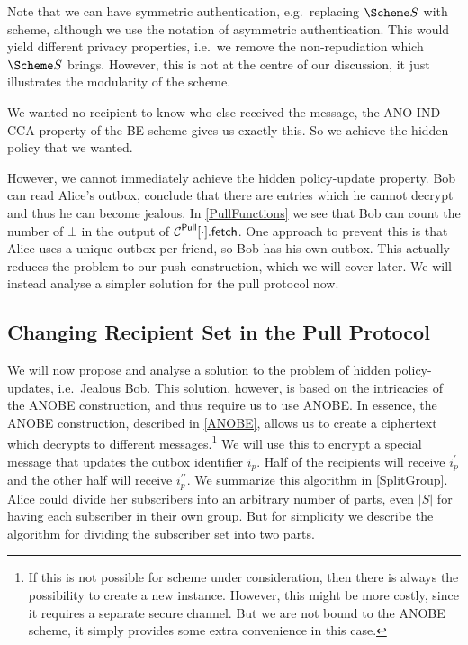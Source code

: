 Note that we can have symmetric authentication, e.g.\ replacing \(\S\) with 
 scheme, although we use the notation of asymmetric authentication.
This would yield different privacy properties, i.e.\ we remove the 
non-repudiation which \(\S\) brings.
However, this is not at the centre of our discussion, it just illustrates the 
modularity of the scheme.

We wanted no recipient to know who else received the message, the ANO-IND-CCA 
property of the \ac{BE} scheme gives us exactly this.
So we achieve the hidden policy that we wanted.

However, we cannot immediately achieve the hidden policy-update property.
Bob can read Alice's outbox, conclude that there are entries which he cannot 
decrypt and thus he can become jealous.
In \cref{PullFunctions} we see that Bob can count the number of \(\bot\) in the 
output of \(\pget{\cdot}\).
One approach to prevent this is that Alice uses a unique outbox per friend, so 
Bob has his own outbox.
This actually reduces the problem to our push construction, which we will cover 
later.
We will instead analyse a simpler solution for the pull protocol now.

\subsection{Changing Recipient Set in the Pull Protocol}
\label{ChangingPullRecipientSet}

We will now propose and analyse a solution to the problem of hidden 
policy-updates, i.e.\ Jealous Bob.
This solution, however, is based on the intricacies of the \ac{ANOBE} 
construction, and thus require us to use \ac{ANOBE}.
In essence, the \ac{ANOBE} construction, described in \cref{ANOBE}, allows us 
to create a ciphertext which decrypts to different messages.\footnote{%
  If this is not possible for  scheme under consideration, then there 
  is always the possibility to create a new instance.
  However, this might be more costly, since it requires a separate secure 
  channel.
  But we are not bound to the \ac{ANOBE} scheme, it simply provides some extra 
  convenience in this case.
}
We will use this to encrypt a special message that updates the outbox 
identifier \(i_p\).
Half of the recipients will receive \(i_p^\prime\) and the other half will 
receive \(i_p^{\prime\prime}\).
We summarize this algorithm in \cref{SplitGroup}.
Alice could divide her subscribers into an arbitrary number of parts, even 
\(|S|\) for having each subscriber in their own group.
But for simplicity we describe the algorithm for dividing the subscriber set 
into two parts.

